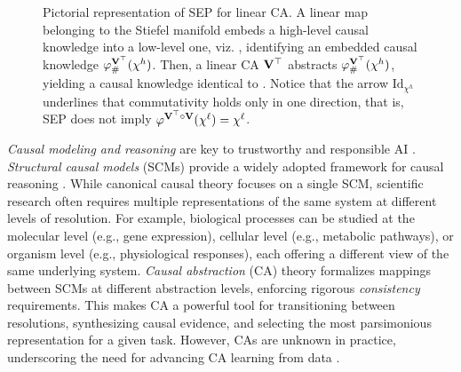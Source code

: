 \begin{figure}[t]
\begin{tikzpicture}[scale=.9]
\end{tikzpicture}
    \caption{
    Pictorial representation of SEP for linear CA.
    A linear map \V belonging to the Stiefel manifold embeds a high-level causal knowledge \measurehigh into a low-level one, viz. \measurelow, identifying an embedded causal knowledge $\varphi_{\#}^{\V^\top}(\chi^h)$.
    Then, a linear CA $\V^\top$ abstracts $\varphi_{\#}^{\V^\top}(\chi^h)$, yielding a causal knowledge identical to \measurehigh.
    Notice that the arrow $\mathrm{Id}_{\chi^h}$ underlines that commutativity holds only in one direction, that is, SEP does not imply $\varphi^{\V^\top \circ \V}(\chi^\ell) = \chi^\ell$.
    }
    \label{fig:fig1}
\end{figure}

\emph{Causal modeling and reasoning} are key to trustworthy and responsible AI \cite{ganguly2023review,rawal2024causality,qi2024causal}. 
\emph{Structural causal models} (SCMs) provide a widely adopted framework for causal reasoning \cite{pearl2009causality}. While canonical causal theory focuses on a single SCM, scientific research often requires multiple representations of the same system at different levels of resolution. 
For example, biological processes can be studied at the molecular level (e.g., gene expression), cellular level (e.g., metabolic pathways), or organism level (e.g., physiological responses), each offering a different view 
of the same underlying system. \emph{Causal abstraction} (CA) theory \cite{rubenstein2017causal,beckers2019abstracting} formalizes mappings between SCMs at different abstraction levels, enforcing rigorous \emph{consistency} requirements.
This makes CA a powerful tool for transitioning between resolutions, synthesizing causal evidence, and selecting the most parsimonious representation for a given task.
However, CAs are unknown in practice, underscoring the need for advancing CA learning from data \cite{zennaro2023jointly}.

